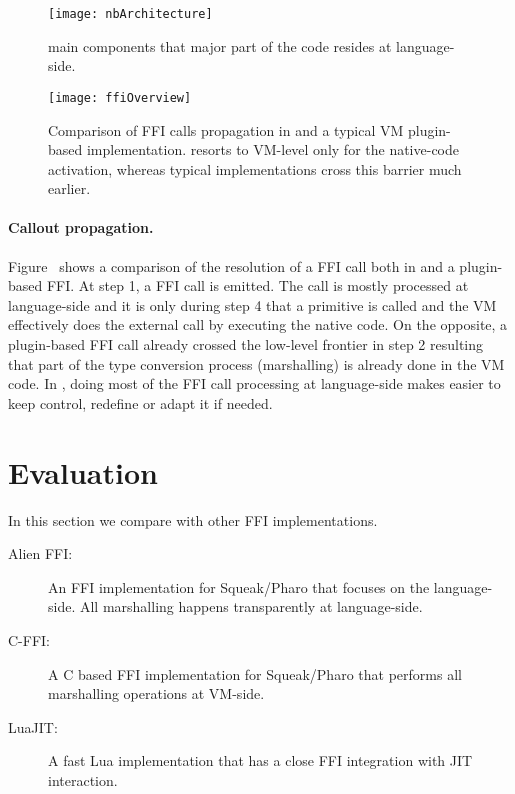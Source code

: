 \begin{figure}[h]
	\centering
	\texttt{[image: nbArchitecture]}
	\caption{\NB main components that major part of the code resides at language-side.}
\end{figure}

\begin{figure*}[t]
	\centering
	\texttt{[image: ffiOverview]}
	\caption{Comparison of FFI calls propagation in \NBFFI and a typical VM plugin-based implementation. \NB resorts to VM-level only for the native-code activation, whereas typical implementations cross this barrier much earlier.}
\end{figure*}

\paragraph{Callout propagation.}
Figure~ shows a comparison of the resolution of a FFI call both in \NBFFI and a plugin-based FFI.
At step 1, a FFI call is emitted.
The \NBFFI call is mostly processed at language-side and it is only during step 4 that a primitive is called and the VM effectively does the external call by executing the native code.
On the opposite, a plugin-based FFI call already crossed the low-level frontier in step 2 resulting that part of the type conversion process (marshalling) is already done in the VM code.
In \NBFFI, doing most of the FFI call processing at language-side makes easier to keep control, redefine or adapt it if needed.

\section{\NBFFI Evaluation}

In this section we compare \NB with other FFI implementations.
\begin{description}
	\item[Alien FFI:] An FFI implementation for Squeak/Pharo that focuses on the language-side. All marshalling happens transparently at language-side.
	\item[C-FFI:] A C based FFI implementation for Squeak/Pharo that performs all marshalling operations at VM-side.
	\item[LuaJIT:] A fast Lua implementation that has a close FFI integration with JIT interaction.
\end{description}

